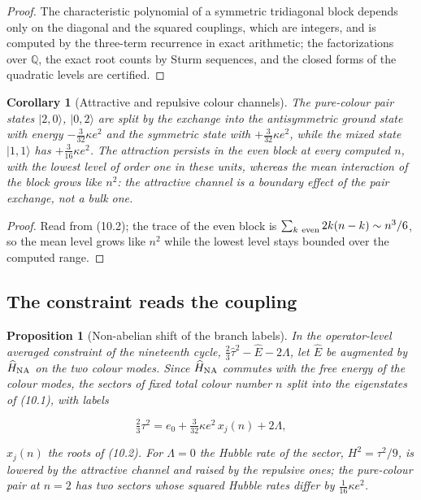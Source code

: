 \documentclass[11pt]{article}
\newtheorem{proposition}[theorem]{Proposition}
\newtheorem{corollary}[theorem]{Corollary}
\theoremstyle{remark}
\begin{document}
\begin{proof}
The characteristic polynomial of a symmetric tridiagonal block
depends only on the diagonal and the squared couplings, which are
integers, and is computed by the three-term recurrence in exact
arithmetic; the factorizations over \(\mathbb Q\), the exact root
counts by Sturm sequences, and the closed forms of the quadratic
levels are certified.
\end{proof}

\begin{corollary}[Attractive and repulsive colour channels]
\label{cor:v20v7-channels}
The pure-colour pair states \(|2,0\rangle\), \(|0,2\rangle\) are split
by the exchange into the antisymmetric ground state with energy
\(-\tfrac3{32}\kappa e^2\) and the symmetric state with
\(+\tfrac3{32}\kappa e^2\), while the mixed state \(|1,1\rangle\) has
\(+\tfrac3{16}\kappa e^2\).  The attraction persists in the even block
at every computed \(n\), with the lowest level of order one in these
units, whereas the mean interaction of the block grows like \(n^2\):
the attractive channel is a boundary effect of the pair exchange, not
a bulk one.
\end{corollary}

\begin{proof}
Read from (10.2); the trace of the even block is
\(\sum_{k\ \rm even}2k(n-k)\sim n^3/6\), so the mean level grows like
\(n^2\) while the lowest level stays bounded over the computed range.
\end{proof}

\subsection{The constraint reads the coupling}

\begin{proposition}[Non-abelian shift of the branch labels]
\label{prop:v20v7-labels}
In the operator-level averaged constraint of the nineteenth cycle,
\(\tfrac23\hat\tau^2-\widehat E-2\Lambda\), let \(\widehat E\) be
augmented by \(\widehat H_{\rm NA}\) on the two colour modes.  Since
\(\widehat H_{\rm NA}\) commutes with the free energy of the colour
modes, the sectors of fixed total colour number \(n\) split into the
eigenstates of (10.1), with labels

\[
 \tfrac23\tau^2=e_0+\tfrac3{32}\kappa e^2\,x_j(n)+2\Lambda,              \tag{10.3}
\]

\(x_j(n)\) the roots of (10.2).  For \(\Lambda=0\) the Hubble rate of
the sector, \(H^2=\tau^2/9\), is lowered by the attractive channel and
raised by the repulsive ones; the pure-colour pair at \(n=2\) has two
sectors whose squared Hubble rates differ by \(\tfrac1{16}\kappa e^2\).
\end{proposition}
\end{document}
